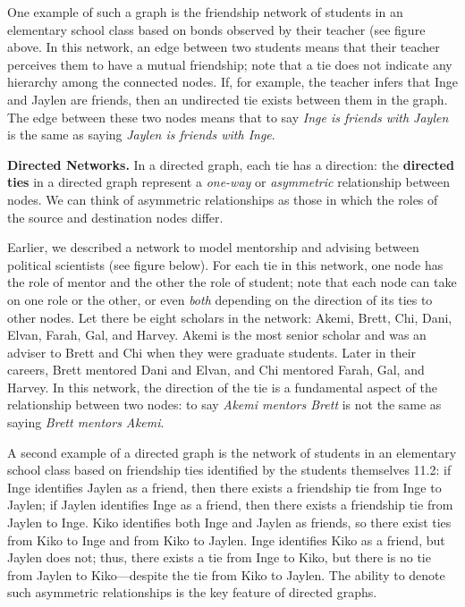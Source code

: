 \documentclass{book}
\begin{document}
One example of such a graph is the friendship network of students in an
elementary school class based on bonds observed by their teacher (see figure
above. In this network, an edge between two students means that their teacher
perceives them to have a mutual friendship; note that a tie does not indicate
any hierarchy among the connected nodes. If, for example, the teacher infers
that Inge and Jaylen are friends, then an undirected tie exists between them
in the graph. The edge between these two nodes means that to say \emph{Inge is
friends with Jaylen} is the same as saying \emph{Jaylen is friends with Inge}.

\textbf{Directed Networks.} In a directed graph, each tie has a direction: the
\textbf{directed ties} in a directed graph represent a \emph{one-way} or
\emph{asymmetric} relationship between nodes. We can think of asymmetric
relationships as those in which the roles of the source and destination nodes
differ.

Earlier, we described a network to model mentorship and advising between
political scientists (see figure below). For each tie in this network, one
node has the role of mentor and the other the role of student; note that each
node can take on one role or the other, or even \emph{both} depending on the
direction of its ties to other nodes. Let there be eight scholars in the
network: Akemi, Brett, Chi, Dani, Elvan, Farah, Gal, and Harvey. Akemi is the
most senior scholar and was an adviser to Brett and Chi when they were
graduate students. Later in their careers, Brett mentored Dani and Elvan, and
Chi mentored Farah, Gal, and Harvey. In this network, the direction of the tie
is a fundamental aspect of the relationship between two nodes: to say
\emph{Akemi mentors Brett} is not the same as saying \emph{Brett mentors
Akemi}.

A second example of a directed graph is the network of students in an
elementary school class based on friendship ties identified by the students
themselves 11.2: if Inge identifies Jaylen as a friend, then there exists a
friendship tie from Inge to Jaylen; if Jaylen identifies Inge as a friend,
then there exists a friendship tie from Jaylen to Inge. Kiko identifies both
Inge and Jaylen as friends, so there exist ties from Kiko to Inge and from
Kiko to Jaylen. Inge identifies Kiko as a friend, but Jaylen does not; thus,
there exists a tie from Inge to Kiko, but there is no tie from Jaylen to
Kiko---despite the tie from Kiko to Jaylen. The ability to denote such
asymmetric relationships is the key feature of directed graphs.
\end{document}
